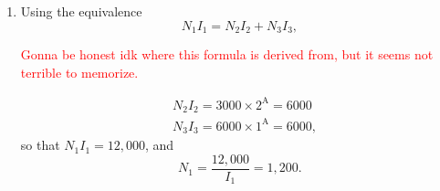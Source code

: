 \documentclass{article}
\begin{document}
\begin{enumerate}[label=\thesubsection]
			\textcolor{red}{Also pretty straightforward, power over voltage gives you current, and power consumed in each winding is provided in the problem description. It's important to note that we we are given real and reactive power separately, so in the above, I took the absolute value to find apparent power, \(S = \sqrt{P^2 + Q^2}\). I did get docked points for not including the phase of each current, though, so it would have been better to use the complex power \(\overline{S}\) in the numerator, and find the corresponding current phasor (though the magnitudes I found are correct).}

			\setcounter{subsection}{12}
		\item Using the equivalence
			\[
			  N_1 I_1 = N_2 I_2 + N_3 I_3,
			\]

			\textcolor{red}{Gonna be honest idk where this formula is derived from, but it seems not terrible to memorize.}

			\begin{align*}
			  &N_2 I_2 = 3000 \times 2^{\mathrm{A}} = 6000 \\
				&N_3 I_3 = 6000 \times 1^{\mathrm{A}} = 6000,
			\end{align*}
			so that \(N_1 I_1 = 12,000\), and
			\[
			  N_1 = \frac{12,000}{I_1} = 1,200.
			\]
\end{enumerate}
\end{document}
